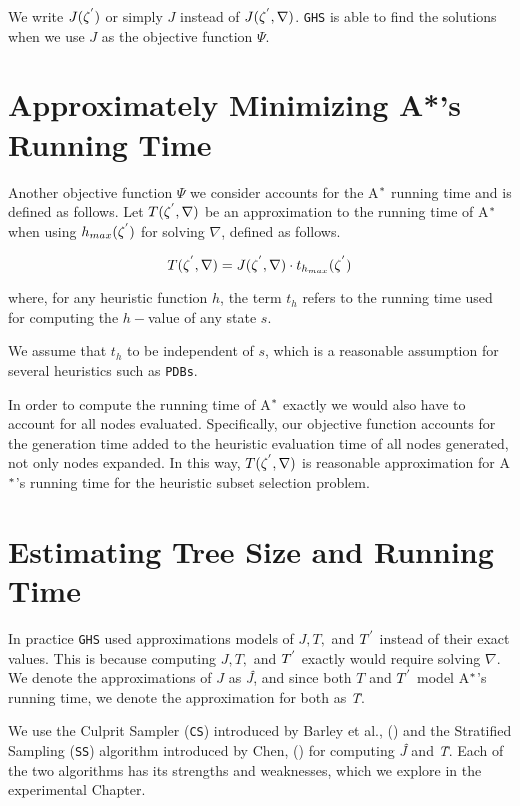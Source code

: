 We write $J(\zeta\sp{'})$ or simply $J$ instead of $J(\zeta\sp{'},\nabla)$. \texttt{GHS} is able to find the solutions when we use $J$ as the objective function $\Psi$.

\section{Approximately Minimizing A*'s Running Time}
\noindent
Another objective function $\Psi$ we consider accounts for the A$\sp{*}$ running time and is defined as follows. Let $T(\zeta\sp{'},\nabla)$ be an approximation to the running time of A$\sp{*}$ when using $h_{max}(\zeta\sp{'})$ for solving $\nabla$, defined as follows.

\begin{equation}
T(\zeta\sp{'}, \nabla) = J(\zeta\sp{'},\nabla) \cdot t_{h_{max}}(\zeta\sp{'})
\label{eq:eq_time_solving}
\end{equation}

where, for any heuristic function $h$, the term $t_{h}$ refers to the running time used for computing the $h-$value of any state $s$.

We assume that $t_{h}$ to be independent of $s$, which is a reasonable assumption for several heuristics such as \texttt{PDBs}.

In order to compute the running time of A$\sp{*}$ exactly we would also have to account for all nodes evaluated. Specifically, our objective function accounts for the generation time added to the heuristic evaluation time of all nodes generated, not only nodes expanded. In this way, $T(\zeta\sp{'},\nabla)$ is reasonable approximation for A$\sp{*}$'s running time for the heuristic subset selection problem.\\

\section{Estimating Tree Size and Running Time}
In  practice \texttt{GHS} used approximations models of $J,T,$ and $T\sp{'}$ instead of their exact values. This is because computing $J,T,$ and $T\sp{'}$ exactly would require solving $\nabla$. We denote the approximations of $J$ as \textit{\^{J}}, and since both $T$ and $T\sp{'}$ model A$\sp{*}$'s running time, we denote the approximation for both as \textit{\^{T}}.

We use the Culprit Sampler (\texttt{CS}) introduced by Barley et al., (\citeyear{BarleySantiagoOver}) and the Stratified Sampling (\texttt{SS}) algorithm introduced by Chen, (\citeyear{chen1992heuristic}) for computing \textit{\^{J}} and \textit{\^{T}}. Each of the two algorithms has its strengths and weaknesses, which we explore in the experimental Chapter.

